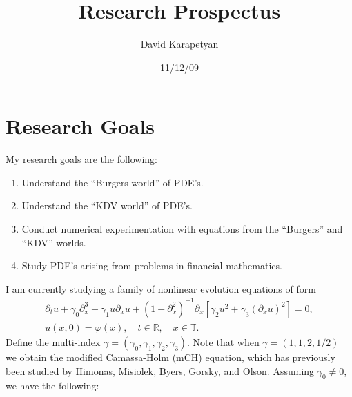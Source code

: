 \documentclass[12pt,reqno]{amsart}
\newcommand{\rr}{\mathbb{R}}
\newcommand{\p}{\partial}
\newcommand{\ci}{\mathbb{T}}
\newcommand{\vp}{\varphi}
\theoremstyle{plain}  %
\begin{document}
\title{Research Prospectus }
\author{David Karapetyan}
\address{Department of Mathematics  \\
         University  of Notre Dame\\
		          Notre Dame, IN 46556 }
				  \date{11/12/09}
				  \maketitle
				  \parindent0in
				  \parskip0.1in
				  \section{Research Goals}
				  \setcounter{equation}{0}
				  My research goals are the following:
				  \begin{enumerate}
					  \item Understand the ``Burgers world'' of PDE's.
					  \item Understand the ``KDV world'' of PDE's.
					  \item Conduct numerical experimentation with
						  equations from the ``Burgers'' and ``KDV''
						  worlds.
					  \item Study PDE's arising from problems in
						  financial mathematics. 
				  \end{enumerate}
				  I am currently studying a family of nonlinear evolution
				  equations of form
%
%
\begin{gather}
	\label{mch}
		 \p_t u + \gamma_0 \p_x^3 + \gamma_1 u \p_x u + (1 - \p_x^2)^{-1}
		\p_x \left[ \gamma_2 u^2 + \gamma_3 (\p_x u)^2 \right] = 0,
		\\
		u(x,0) = \vp(x), \quad t \in \rr, \quad x \in \ci.
		\label{mch-init-data}
	\end{gather}
%
%
Define the multi-index $\gamma = (\gamma_0, \gamma_1, \gamma_2, \gamma_3)$.
Note that when $\gamma = (1,1,2, 1/2)$ we
obtain the modified Camassa-Holm (mCH) equation, which has previously been
studied by Himonas, Misiolek, Byers, Gorsky, and Olson. Assuming $\gamma_0
\neq 0$, we have the following:
%
%
%
%
%
%
%
%
%
%
%
%
%
\end{document}
